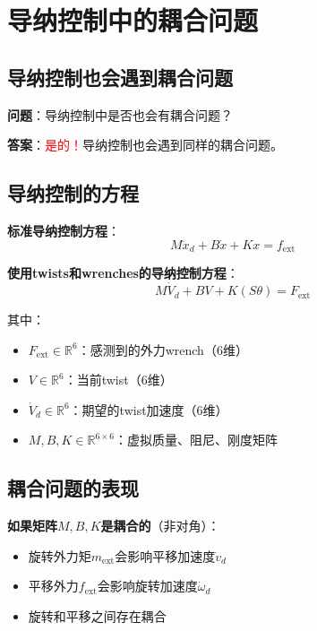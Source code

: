\documentclass[12pt,a4paper]{article}
\begin{document}
\section{导纳控制中的耦合问题}

\subsection{导纳控制也会遇到耦合问题}

\textbf{问题}：导纳控制中是否也会有耦合问题？

\textbf{答案}：\textcolor{red}{是的！}导纳控制也会遇到同样的耦合问题。

\subsection{导纳控制的方程}

\textbf{标准导纳控制方程}：
\begin{equation}
M\ddot{x}_d + B\dot{x} + Kx = f_{\text{ext}} \tag{11.64-admittance}
\end{equation}

\textbf{使用twists和wrenches的导纳控制方程}：
\begin{equation}
M\dot{V}_d + BV + K(S\theta) = F_{\text{ext}} \tag{11.64-admittance-twist}
\end{equation}

其中：
\begin{itemize}
\item $F_{\text{ext}} \in \mathbb{R}^6$：感测到的外力wrench（6维）
\item $V \in \mathbb{R}^6$：当前twist（6维）
\item $\dot{V}_d \in \mathbb{R}^6$：期望的twist加速度（6维）
\item $M, B, K \in \mathbb{R}^{6 \times 6}$：虚拟质量、阻尼、刚度矩阵
\end{itemize}

\subsection{耦合问题的表现}

\textbf{如果矩阵$M, B, K$是耦合的}（非对角）：
\begin{itemize}
\item 旋转外力矩$m_{\text{ext}}$会影响平移加速度$\dot{v}_d$
\item 平移外力$f_{\text{ext}}$会影响旋转加速度$\dot{\omega}_d$
\item 旋转和平移之间存在耦合
\end{itemize}
\end{document}
